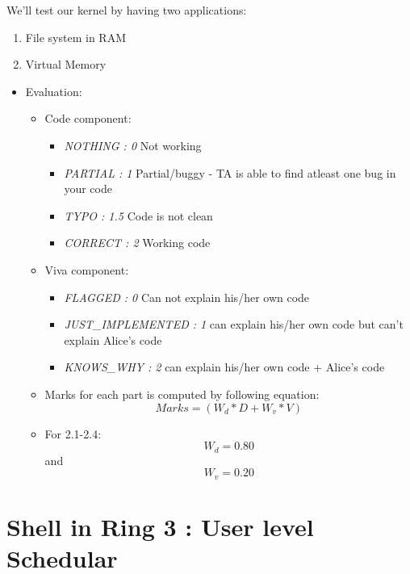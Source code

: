\documentclass[]{book}
\begin{document}
We'll test our kernel by having two applications:

\begin{enumerate}
\def\labelenumi{\arabic{enumi}.}
\itemsep1pt\parskip0pt
\item
  File system in RAM
\item
  Virtual Memory
\end{enumerate}

\begin{itemize}
\itemsep1pt\parskip0pt
\item
  Evaluation:

  \begin{itemize}
  \item
    Code component:

    \begin{itemize}
    \itemsep1pt\parskip0pt
    \item
      \emph{NOTHING : 0 } Not working
    \item
      \emph{PARTIAL : 1 } Partial/buggy - TA is able to find atleast one
      bug in your code
    \item
      \emph{TYPO : 1.5} Code is not clean
    \item
      \emph{CORRECT : 2 } Working code
    \end{itemize}
  \item
    Viva component:

    \begin{itemize}
    \itemsep1pt\parskip0pt
    \item
      \emph{FLAGGED : 0 } Can not explain his/her own code
    \item
      \emph{JUST\_IMPLEMENTED : 1 } can explain his/her own code but
      can't explain Alice's code
    \item
      \emph{KNOWS\_WHY : 2 } can explain his/her own code + Alice's code
    \end{itemize}
  \item
    Marks for each part is computed by following equation:
    \[ Marks = (W_d * D + W_v * V) \]
  \item
    For 2.1-2.4: \[ W_d = 0.80 \] and \[ W_v = 0.20 \]
  \end{itemize}
\end{itemize}

\section{Shell in Ring 3 : User level
Schedular}\label{shell-in-ring-3-user-level-schedular}
\end{document}
